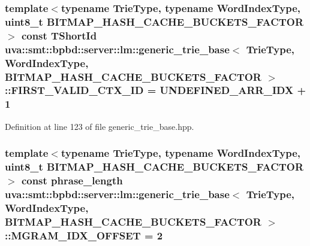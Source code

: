 \subsubsection[{F\+I\+R\+S\+T\+\_\+\+V\+A\+L\+I\+D\+\_\+\+C\+T\+X\+\_\+\+I\+D}]{\setlength{\rightskip}{0pt plus 5cm}template$<$typename Trie\+Type, typename Word\+Index\+Type, uint8\+\_\+t B\+I\+T\+M\+A\+P\+\_\+\+H\+A\+S\+H\+\_\+\+C\+A\+C\+H\+E\+\_\+\+B\+U\+C\+K\+E\+T\+S\+\_\+\+F\+A\+C\+T\+O\+R$>$ const {\bf T\+Short\+Id} {\bf uva\+::smt\+::bpbd\+::server\+::lm\+::generic\+\_\+trie\+\_\+base}$<$ Trie\+Type, {\bf Word\+Index\+Type}, B\+I\+T\+M\+A\+P\+\_\+\+H\+A\+S\+H\+\_\+\+C\+A\+C\+H\+E\+\_\+\+B\+U\+C\+K\+E\+T\+S\+\_\+\+F\+A\+C\+T\+O\+R $>$\+::F\+I\+R\+S\+T\+\_\+\+V\+A\+L\+I\+D\+\_\+\+C\+T\+X\+\_\+\+I\+D = {\bf U\+N\+D\+E\+F\+I\+N\+E\+D\+\_\+\+A\+R\+R\+\_\+\+I\+D\+X} + 1\hspace{0.3cm}{\ttfamily [static]}}\label{classuva_1_1smt_1_1bpbd_1_1server_1_1lm_1_1generic__trie__base_a54abc3730778b6237fe456b1a6cf8dad}


Definition at line 123 of file generic\+\_\+trie\+\_\+base.\+hpp.

\hypertarget{classuva_1_1smt_1_1bpbd_1_1server_1_1lm_1_1generic__trie__base_abcd0fc0a9413690cc1f763e20a4fadc3}{}
\subsubsection[{M\+G\+R\+A\+M\+\_\+\+I\+D\+X\+\_\+\+O\+F\+F\+S\+E\+T}]{\setlength{\rightskip}{0pt plus 5cm}template$<$typename Trie\+Type, typename Word\+Index\+Type, uint8\+\_\+t B\+I\+T\+M\+A\+P\+\_\+\+H\+A\+S\+H\+\_\+\+C\+A\+C\+H\+E\+\_\+\+B\+U\+C\+K\+E\+T\+S\+\_\+\+F\+A\+C\+T\+O\+R$>$ const {\bf phrase\+\_\+length} {\bf uva\+::smt\+::bpbd\+::server\+::lm\+::generic\+\_\+trie\+\_\+base}$<$ Trie\+Type, {\bf Word\+Index\+Type}, B\+I\+T\+M\+A\+P\+\_\+\+H\+A\+S\+H\+\_\+\+C\+A\+C\+H\+E\+\_\+\+B\+U\+C\+K\+E\+T\+S\+\_\+\+F\+A\+C\+T\+O\+R $>$\+::M\+G\+R\+A\+M\+\_\+\+I\+D\+X\+\_\+\+O\+F\+F\+S\+E\+T = 2\hspace{0.3cm}{\ttfamily [static]}}\label{classuva_1_1smt_1_1bpbd_1_1server_1_1lm_1_1generic__trie__base_abcd0fc0a9413690cc1f763e20a4fadc3}


